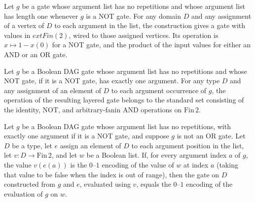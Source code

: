 \begin{definition}
\label{BoolCircuit.layerGateOf}
\leanok
{}
Let $g$ be a gate whose argument list has no repetitions and whose argument list has
length one whenever $g$ is a NOT gate. For any domain $D$ and any assignment of a vertex
of $D$ to each argument in the list, the construction gives a gate with values in
$	ext{Fin}(2)$, wired to those assigned vertices. Its operation is $x\mapsto 1-x(0)$ for
a NOT gate, and the product of the input values for either an AND or an OR gate.
\end{definition}

\begin{theorem}
\label{BoolCircuit.layerGateOf_mem}
\leanok
{}
Let $g$ be a Boolean DAG gate whose argument list has no repetitions and whose NOT gate,
if it is a NOT gate, has exactly one argument. For any type $D$ and any assignment of an
element of $D$ to each argument occurrence of $g$, the operation of the resulting
layered gate belongs to the standard set consisting of the identity, NOT, and
arbitrary-fanin AND operations on $\mathrm{Fin}\,2$.
\end{theorem}

\begin{theorem}
\label{BoolCircuit.layerGateOf_eval}
\leanok
{}
Let $g$ be a Boolean DAG gate whose argument list has no repetitions, with exactly one
argument if it is a NOT gate, and suppose $g$ is not an OR gate. Let $D$ be a type, let
$e$ assign an element of $D$ to each argument position in the list, let
$v:D\to\mathrm{Fin}\,2$, and let $w$ be a Boolean list. If, for every argument index $a$
of $g$, the value $v(e(a))$ is the $0$–$1$ encoding of the value of $w$ at index $a$
(taking that value to be false when the index is out of range), then the gate on $D$
constructed from $g$ and $e$, evaluated using $v$, equals the $0$–$1$ encoding of the
evaluation of $g$ on $w$.
\end{theorem}

